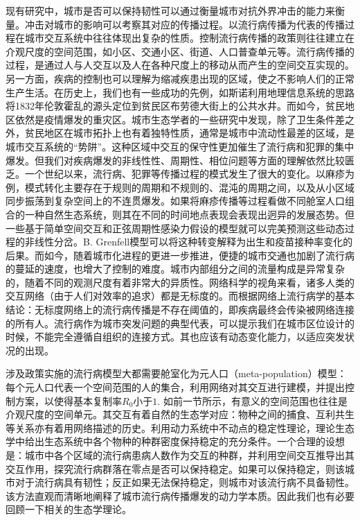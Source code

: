 现有研究中，城市是否可以保持韧性可以通过衡量城市对抗外界冲击的能力来衡量。冲击对城市的影响可以考察其对应的传播过程\cite
{massaro2018resilience}。以流行病传播为代表的传播过程在城市交互系统中往往体现出复杂的性质。控制流行病传播的政策则往往建立在介观尺度的空间范围，如小区、交通小区、街道、人口普查单元等。流行病传播的过程，是通过人与人交互以及人在各种尺度上的移动从而产生的空间交互实现的\cite{belik2011natural}。另一方面，疾病的控制也可以理解为缩减疾患出现的区域，使之不影响人们的正常生产生活。在历史上，我们也有一些成功的先例，如斯诺利用地理信息系统的思路将1832年伦敦霍乱的源头定位到贫民区布劳德大街上的公共水井。而如今，贫民地区依然是疫情爆发的重灾区\cite{sahasranaman2021spread}。城市生态学者的一些研究中发现，除了卫生条件差之外，贫民地区在城市拓扑上也有着独特性质，通常是城市中流动性最差的区域\cite{brelsford2018toward}，是城市交互系统的“势阱”。这种区域中交互的保守性更加催生了流行病和犯罪的集中爆发。但我们对疾病爆发的非线性性、周期性、相位问题等方面的理解依然比较匮乏\cite{dalziel2013human}。一个世纪以来，流行病、犯罪等传播过程的模式发生了很大的变化。以麻疹为例，模式转化主要存在于规则的周期和不规则的、混沌的周期之间，以及从小区域同步振荡到复杂空间上的不连贯爆发。如果将麻疹传播等过程看做不同舱室人口组合的一种自然生态系统，则其在不同的时间地点表现会表现出迥异的发展态势。但一些基于简单空间交互和正弦周期性感染力假设的模型就可以完美预测这些动态过程的非线性分岔。B. Grenfell模型\cite{earn2000a}可以将这种转变解释为出生和疫苗接种率变化的后果。而如今，随着城市化进程的更进一步推进，便捷的城市交通也加剧了流行病的蔓延的速度，也增大了控制的难度。城市内部组分之间的流量构成是异常复杂的，随着不同的观测尺度有着非常大的异质性\cite{masucci2013gravity}。网络科学的视角来看，诸多人类的交互网络（由于人们对效率的追求）都是无标度的。而根据网络上流行病学的基本结论：无标度网络上的流行病传播是不存在阈值的，即疾病最终会传染被网络连接的所有人\cite{eguiluz2002epidemic, plucinski2013clusters}。流行病作为城市突发问题的典型代表，可以提示我们在城市区位设计的时候，不能完全遵循自组织的连接方式。其也应该有动态变化能力，以适应突发状况的出现。

涉及政策实施的流行病模型大都需要舱室化为元人口（meta-population）模型：每个元人口代表一个空间范围的人的集合，利用网络对其交互进行建模，并提出控制方案，以使得基本复制率$R_0$小于$1$. 如前一节所示，有意义的空间范围也往往是介观尺度的空间单元。其交互有着自然的生态学对应：物种之间的捕食、互利共生等关系亦有着用网络描述的历史\cite{may1972will, allesina2012stability, coyte2015ecology}。利用动力系统中不动点的稳定性理论，理论生态学中给出生态系统中各个物种的种群密度保持稳定的充分条件。一个合理的设想是：城市中各个区域的流行病患病人数作为交互的种群，并利用空间交互推导出其交互作用，探究流行病群落在零点是否可以保持稳定。如果可以保持稳定，则该城市对于流行病具有韧性；反正如果无法保持稳定，则城市对该流行病不具备韧性。该方法直观而清晰地阐释了城市流行病传播爆发的动力学本质。因此我们也有必要回顾一下相关的生态学理论。


